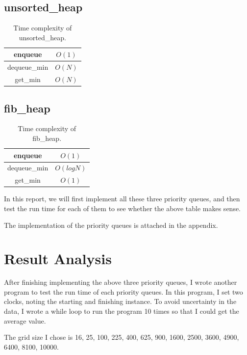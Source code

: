 \documentclass{article}
\begin{document}
\begin{spacing}{2.0}
\subsection{unsorted\_heap}
\begin{table}[!hbp]
\centering
\begin{tabular}{c|c}
enqueue&$O(1)$\\
\hline
dequeue\_min&$O(N)$\\
\hline
get\_min&$O(N)$\\
\end{tabular}
\caption{Time complexity of unsorted\_heap.}
\end{table}
\subsection{fib\_heap}
\begin{table}[!hbp]
\centering
\begin{tabular}{c|c}
enqueue&$O(1)$\\
\hline
dequeue\_min&$O(logN)$\\
\hline
get\_min&$O(1)$\\
\end{tabular}
\caption{Time complexity of fib\_heap.}
\end{table}
In this report, we will first implement all these three priority queues, and then test the run time for each of them to see whether the above table makes sense.

The implementation of the priority queues is attached in the appendix.
\section{Result Analysis}
\indent After finishing implementing the above three priority queues, I wrote another program to test the run time of each priority queues. In this program, I set two clocks, noting the starting and finishing instance. To avoid uncertainty in the data, I wrote a while loop to run the program 10 times so that I could get the average value.

The grid size I chose is 16, 25, 100, 225, 400, 625, 900, 1600, 2500, 3600, 4900, 6400, 8100, 10000.


\end{spacing}
\end{document}
